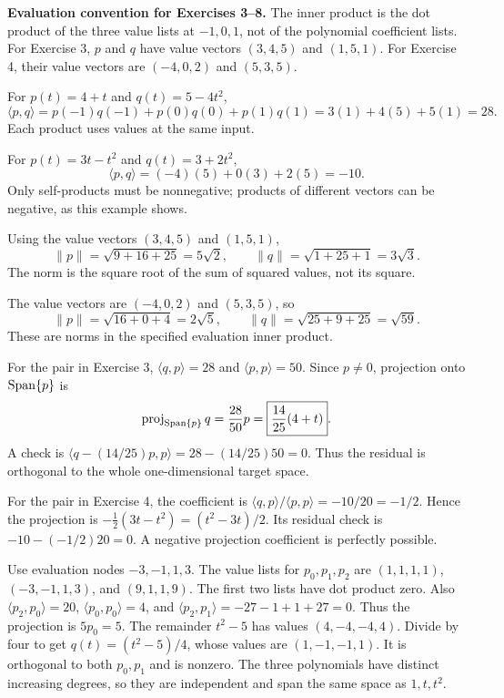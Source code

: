 \textbf{Evaluation convention for Exercises 3--8.}
The inner product is the dot product of the three value lists at
$-1,0,1$, not of the polynomial coefficient lists.
For Exercise 3, $p$ and $q$ have value vectors $(3,4,5)$ and
$(1,5,1)$. For Exercise 4, their value vectors are $(-4,0,2)$
and $(5,3,5)$.

For $p(t)=4+t$ and $q(t)=5-4t^2$,
\[
 \langle p,q\rangle=p(-1)q(-1)+p(0)q(0)+p(1)q(1)
 =3(1)+4(5)+5(1)=\boxed{28}.
\]
Each product uses values at the same input.

For $p(t)=3t-t^2$ and $q(t)=3+2t^2$,
\[
 \langle p,q\rangle=(-4)(5)+0(3)+2(5)=\boxed{-10}.
\]
Only self-products must be nonnegative; products of different vectors
can be negative, as this example shows.

Using the value vectors $(3,4,5)$ and $(1,5,1)$,
\[
 \|p\|=\sqrt{9+16+25}=\boxed{5\sqrt2},\qquad
 \|q\|=\sqrt{1+25+1}=\boxed{3\sqrt3}.
\]
The norm is the square root of the sum of squared values, not its square.

The value vectors are $(-4,0,2)$ and $(5,3,5)$, so
\[
 \|p\|=\sqrt{16+0+4}=\boxed{2\sqrt5},\qquad
 \|q\|=\sqrt{25+9+25}=\boxed{\sqrt{59}}.
\]
These are norms in the specified evaluation inner product.

For the pair in Exercise 3, $\langle q,p\rangle=28$ and
$\langle p,p\rangle=50$. Since $p\ne0$, projection onto
$\operatorname{Span}\{p\}$ is
\[
 \operatorname{proj}_{\operatorname{Span}\{p\}}q
 =\frac{28}{50}p=\boxed{\frac{14}{25}(4+t)}.
\]
A check is $\langle q-(14/25)p,p\rangle=28-(14/25)50=0$.
Thus the residual is orthogonal to the whole one-dimensional target space.

For the pair in Exercise 4, the coefficient is
$\langle q,p\rangle/\langle p,p\rangle=-10/20=-1/2$.
Hence the projection is
$\boxed{-\tfrac12(3t-t^2)=(t^2-3t)/2}$.
Its residual check is $-10-(-1/2)20=0$.
A negative projection coefficient is perfectly possible.

Use evaluation nodes $-3,-1,1,3$.
The value lists for $p_0,p_1,p_2$ are
$(1,1,1,1)$, $(-3,-1,1,3)$, and $(9,1,1,9)$.
The first two lists have dot product zero. Also
$\langle p_2,p_0\rangle=20$, $\langle p_0,p_0\rangle=4$,
and $\langle p_2,p_1\rangle=-27-1+1+27=0$.
Thus the projection is $5p_0=5$.
The remainder $t^2-5$ has values $(4,-4,-4,4)$.
Divide by four to get
$\boxed{q(t)=(t^2-5)/4}$, whose values are $(1,-1,-1,1)$.
It is orthogonal to both $p_0,p_1$ and is nonzero. The three
polynomials have distinct increasing degrees, so they are independent
and span the same space as $1,t,t^2$.

